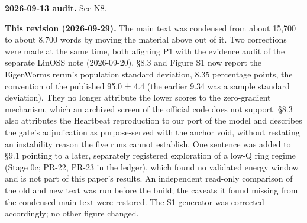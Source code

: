 \documentclass[
  10pt,
]{article}
\begin{document}
\textbf{2026-09-13 audit.} See N8.

\textbf{This revision (2026-09-29).} The main text was condensed from
about 15,700 to about 8,700 words by moving the material above out of
it. Two corrections were made at the same time, both aligning P1 with
the evidence audit of the separate LinOSS note (2026-09-20). §8.3 and
Figure S1 now report the EigenWorms rerun's population standard
deviation, 8.35 percentage points, the convention of the published 95.0
± 4.4 (the earlier 9.34 was a sample standard deviation). They no longer
attribute the lower scores to the zero-gradient mechanism, which an
archived screen of the official code does not support. §8.3 also
attributes the Heartbeat reproduction to our port of the model and
describes the gate's adjudication as purpose-served with the anchor
void, without restating an instability reason the five runs cannot
establish. One sentence was added to §9.1 pointing to a later,
separately registered exploration of a low-Q ring regime (Stage 0c;
PR-22, PR-23 in the ledger), which found no validated energy window and
is not part of this paper's results. An independent read-only comparison
of the old and new text was run before the build; the caveats it found
missing from the condensed main text were restored. The S1 generator was
corrected accordingly; no other figure changed.
\end{document}
